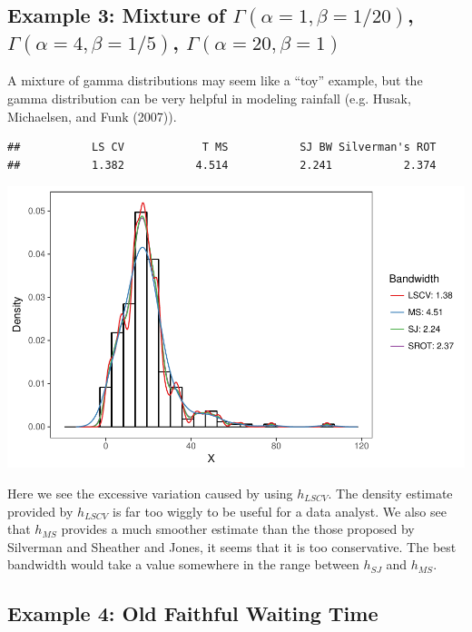 \documentclass[]{article}
\begin{document}
\newpage

\subsection{Example 3: Mixture of $\Gamma(\alpha = 1, \beta = 1/20)$, $\Gamma(\alpha = 4, \beta = 1/5)$, $\Gamma(\alpha = 20, \beta = 1)$}

A mixture of gamma distributions may seem like a ``toy'' example, but
the gamma distribution can be very helpful in modeling rainfall (e.g.
Husak, Michaelsen, and Funk (2007)).

\begin{verbatim}
##           LS CV            T MS           SJ BW Silverman's ROT 
##           1.382           4.514           2.241           2.374
\end{verbatim}

\begin{center}\includegraphics{FinalReport_files/figure-latex/unnamed-chunk-8-1} \end{center}

Here we see the excessive variation caused by using \(h_{LSCV}\). The
density estimate provided by \(h_{LSCV}\) is far too wiggly to be useful
for a data analyst. We also see that \(h_{MS}\) provides a much smoother
estimate than the those proposed by Silverman and Sheather and Jones, it
seems that it is too conservative. The best bandwidth would take a value
somewhere in the range between \(h_{SJ}\) and \(h_{MS}\).

\newpage

\subsection{Example 4: Old Faithful Waiting Time}
\end{document}
